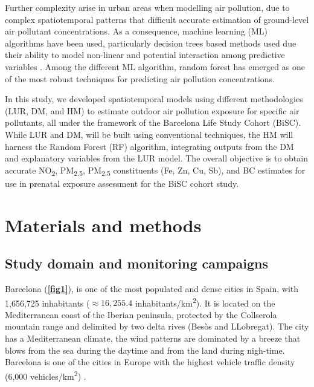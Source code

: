 \documentclass{article}
\begin{document}
Further complexity arise in urban areas when modelling air pollution, due to complex spatiotemporal patterns that difficult accurate estimation of ground-level air pollutant concentrations\cite{}. As a consequence, machine learning (ML) algorithms have been used, particularly decision trees based methods used due their ability to model non-linear and potential interaction among predictive variables \cite{}. Among the different ML algorithm, random forest has emerged as one of the most robust techniques for predicting air pollution concentrations\cite{}.

In this study, we developed spatiotemporal models using different methodologies (LUR, DM, and HM) to estimate outdoor air pollution exposure for specific air pollutants, all under the framework of the Barcelona Life Study Cohort (BiSC). While LUR and DM, will be built using conventional techniques, the HM will harness the Random Forest (RF) algorithm, integrating outputs from the DM and explanatory variables from the LUR model. The overall objective is to obtain accurate NO\textsubscript{2}, PM\textsubscript{2.5}, PM\textsubscript{2.5} constituents (Fe, Zn, Cu, Sb), and BC estimates for use in prenatal exposure assessment for the BiSC cohort study. 

\section{Materials and methods}

\subsection{Study domain and monitoring campaigns}

Barcelona (\textbf{\cref{fig1}}), is one of the most populated and dense cities in Spain, with 1,656,725 inhabitants ($\approx16,255.4$ inhabitants/km\textsuperscript{2}). It is located on the Mediterranean coast of the Iberian peninsula, protected by the Collserola mountain range and delimited by two delta rives (Besòs and LLobregat). The city has a Mediterranean climate, the wind patterns are dominated by a breeze that blows from the sea during the daytime and from the land during nigh-time. Barcelona is one of the cities in Europe with the highest vehicle traffic density (6,000 vehicles/km\textsuperscript{2}) \cite{casallas2018}. 
\end{document}
